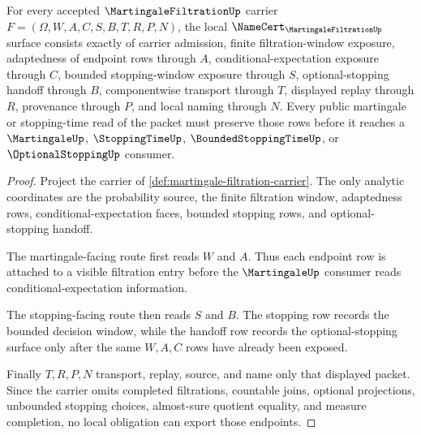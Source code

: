 \begin{theorem}
\label{thm:martingale-filtration-namecert-obligations}
For every accepted $\MartingaleFiltrationUp$ carrier $F=(\Omega,W,A,C,S,B,T,R,P,N)$, the local $\NameCert_{\MartingaleFiltrationUp}$ surface consists exactly of carrier admission, finite filtration-window exposure, adaptedness of endpoint rows through $A$, conditional-expectation exposure through $C$, bounded stopping-window exposure through $S$, optional-stopping handoff through $B$, componentwise transport through $T$, displayed replay through $R$, provenance through $P$, and local naming through $N$. Every public martingale or stopping-time read of the packet must preserve those rows before it reaches a $\MartingaleUp$, $\StoppingTimeUp$, $\BoundedStoppingTimeUp$, or $\OptionalStoppingUp$ consumer.
\end{theorem}
\begin{proof}
Project the carrier of \autoref{def:martingale-filtration-carrier}. The only analytic coordinates are the probability source, the finite filtration window, adaptedness rows, conditional-expectation faces, bounded stopping rows, and optional-stopping handoff.

The martingale-facing route first reads $W$ and $A$. Thus each endpoint row is attached to a visible filtration entry before the $\MartingaleUp$ consumer reads conditional-expectation information.

The stopping-facing route then reads $S$ and $B$. The stopping row records the bounded decision window, while the handoff row records the optional-stopping surface only after the same $W,A,C$ rows have already been exposed.

Finally $T,R,P,N$ transport, replay, source, and name only that displayed packet. Since the carrier omits completed filtrations, countable joins, optional projections, unbounded stopping choices, almost-sure quotient equality, and measure completion, no local obligation can export those endpoints.
\end{proof}

